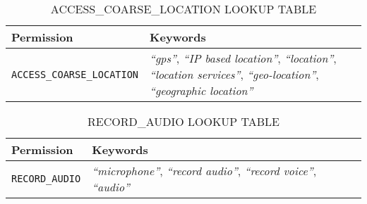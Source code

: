 \begin{table}[tbh]
    \caption{ACCESS\_COARSE\_LOCATION LOOKUP TABLE}
    \label{tab:lookup-coarse-location}
    \centering
    \begin{tabular}{lp{6cm}}
        \toprule
            Permission   & Keywords \\
            \midrule
                \texttt{ACCESS\_COARSE\_LOCATION}  & \emph{``gps''}, \emph{``IP based location''}, \emph{``location''}, \emph{``location services''}, \emph{``geo-location''}, \emph{``geographic location''} \\
        \bottomrule
    \end{tabular}
\end{table}

\begin{table}[tbh]
    \caption{RECORD\_AUDIO LOOKUP TABLE}
    \label{tab:lookup-record-audio}
    \centering
    \begin{tabular}{lp{9cm}}
        \toprule
            Permission   & Keywords \\
            \midrule
                \texttt{RECORD\_AUDIO}  & \emph{``microphone''}, \emph{``record audio''}, \emph{``record voice''}, \emph{``audio''} \\
        \bottomrule
    \end{tabular}
\end{table}
